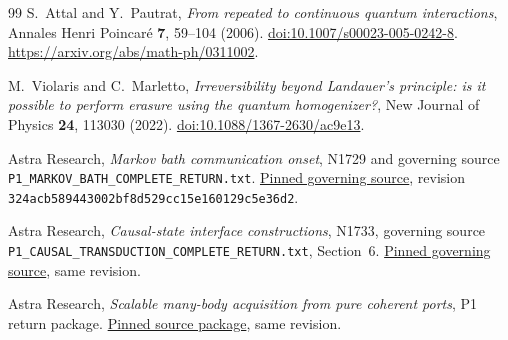\documentclass[11pt]{article}
\numberwithin{equation}{section}
\theoremstyle{remark}
\begin{document}
\begin{thebibliography}{99}
S.~Attal and Y.~Pautrat,
\emph{From repeated to continuous quantum interactions},
Annales Henri Poincar\'e \textbf{7}, 59--104 (2006).
\href{https://doi.org/10.1007/s00023-005-0242-8}
{doi:10.1007/s00023-005-0242-8}.
\url{https://arxiv.org/abs/math-ph/0311002}.

M.~Violaris and C.~Marletto,
\emph{Irreversibility beyond Landauer's principle: is it possible to perform
erasure using the quantum homogenizer?},
New Journal of Physics \textbf{24}, 113030 (2022).
\href{https://doi.org/10.1088/1367-2630/ac9e13}
{doi:10.1088/1367-2630/ac9e13}.

Astra Research, \emph{Markov bath communication onset}, N1729 and governing
source \texttt{P1\_MARKOV\_BATH\_COMPLETE\_RETURN.txt}.
\href{https://github.com/harjassand/astra-research-knowledge/blob/324acb589443002bf8d529cc15e160129c5e36d2/research/2026-11-04-markov-bath-communication-onset/source/P1_MARKOV_BATH_COMPLETE_RETURN.txt}
{Pinned governing source}, revision
\texttt{324acb589443002bf8d529cc15e160129c5e36d2}.

Astra Research, \emph{Causal-state interface constructions}, N1733,
governing source \texttt{P1\_CAUSAL\_TRANSDUCTION\_COMPLETE\_RETURN.txt},
Section~6.
\href{https://github.com/harjassand/astra-research-knowledge/blob/324acb589443002bf8d529cc15e160129c5e36d2/research/2026-11-04-causal-state-interface-constructions/source/P1_CAUSAL_TRANSDUCTION_COMPLETE_RETURN.txt}
{Pinned governing source}, same revision.

Astra Research, \emph{Scalable many-body acquisition from pure coherent
ports}, P1 return package.
\href{https://github.com/harjassand/astra-research-knowledge/tree/324acb589443002bf8d529cc15e160129c5e36d2/research/returns/2026-11-05-p1-scalable-many-body-acquisition}
{Pinned source package}, same revision.
\end{thebibliography}
\end{document}
